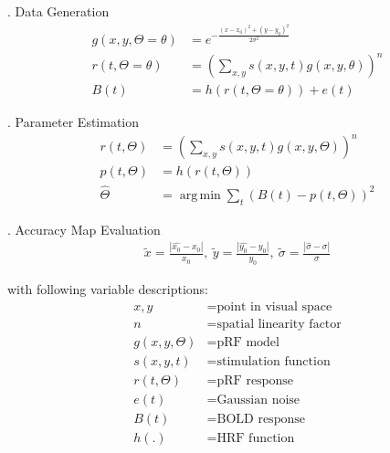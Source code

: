 \documentclass[portrait,final,a0paper,fontscale=0.277]{baposter}
\DeclareMathOperator*{\argmin}{arg\,min}
\begin{document}
\begin{poster}
{    . Data Generation
  	\begin{align*}
  	g(x, y, \Theta=\theta) &= e^{-\frac{(x-x_0)^2+(y-y_0)^2}{2\sigma^2}}\\
  	r(t, \Theta=\theta) &= (\sum_{x, y} s(x, y, t) g(x,y, \theta))^n\\
  	B(t) &=  h(r(t, \Theta=\theta)) + e(t)
	\end{align*}
	
	. Parameter Estimation
  	\begin{align*}
 	r(t, \Theta) &= (\sum_{x, y} s(x, y, t) g(x, y, \Theta))^n\\
 	p(t, \Theta) &= h(r(t, \Theta))\\
  	\hat{\Theta} &= \argmin{\sum_{t}^{}(B(t) - p(t, \Theta))^2}
  	\end{align*}
  	
  	. Accuracy Map Evaluation
	\begin{align*}
  	\tilde{x} = \frac{|\hat{x_0}-x_0|}{x_0},~\tilde{y} = \frac{|\hat{y_0}-y_0|}{y_0},~\tilde{\sigma} = \frac{|\hat{\sigma}-\sigma|}{\sigma}
  	\end{align*}
  	
  	\smaller
  	\noindent with following variable descriptions:
    \begin{align*}
    x, y &= \text{point in visual space}\\
    n &= \text{spatial linearity factor}\\
  	g(x, y, \Theta) &= \text{pRF model}\\
  	s(x, y, t) &= \text{stimulation function}\\
  	r(t, \Theta) &= \text{pRF response}\\
  	e(t) &= \text{Gaussian noise}\\
  	B(t) &= \text{BOLD response}\\
  	h(.) &= \text{HRF function}\\
  	\end{align*}
 
   \vspace{0.3em}
  }








\end{poster}
\end{document}
